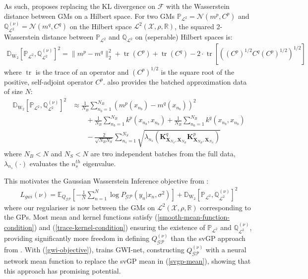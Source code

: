 \documentclass{article}
\newcommand{\WD}{\operatorname{\mathbb{D}_{W_2}}}
\newcommand{\tr}{\operatorname{tr}}
\newcommand{\GP}{\operatorname{\mathcal{GP}}}
\numberwithin{equation}{section}
\begin{document}
As such, \cite{wild2022generalized} proposes replacing the KL divergence on $\mathcal{F}$ with the Wasserstein distance between GMs on a Hilbert space. For two GMs $\mathbb{P}_{\mathcal{L}^2} = \mathcal{N}(m^p, C^p)$ and $\mathbb{Q}^{(\nu)}_{\mathcal{L}^2} = \mathcal{N}(m^q, C^q)$ on the Hilbert space $\mathcal{L}^2(\mathcal{X}, \rho, \mathbb{R})$, the squared 2-Wasserstein distance between $\mathbb{P}_{\mathcal{L}^2}$ and $\mathbb{Q}_{\mathcal{L}^2}$ on (seperable) Hilbert spaces is:
\begin{align}
    \label{wasserstein-distance}
    \WD \left[\mathbb{P}_{\mathcal{L}^2}, \mathbb{Q}^{(\nu)}_{\mathcal{L}^2}\right]^2 = \| m^p - m^q\|_2^2 + \tr(C^p) + \tr(C^q) - 2 \cdot \tr \left[ \left( \left(C^p\right)^{1/2} C^q \left(C^p\right)^{1/2}\right)^{1/2}\right]
\end{align}
where $\tr$ is the trace of an operator and $\left(C^p\right)^{1/2}$ is the square root of the positive, self-adjoint operator $C^p$. \cite{wild2022generalized} also provides the batched approximation data of size $N$:
\begin{align}
    \WD \left[\mathbb{P}_{\mathcal{L}^2}, \mathbb{Q}^{(\nu)}_{\mathcal{L}^2}\right]^2 &\approx \frac{1}{N_B}\sum_{n_b=1}^{N_B} \left(m^p(x_{n_b}) - m^q(x_{n_b})\right)^2 \nonumber \\
    & \qquad + \frac{1}{N_B} \sum_{n_b=1}^{N_B} k^p(x_{n_b}, x_{n_b}) + \frac{1}{N_B} \sum_{n_b=1}^{N_B} k^q(x_{n_b}, x_{n_b}) \nonumber \\
    & \qquad - \frac{2}{\sqrt{N_B N_S}} \sum_{n_s=1}^{N_S} \sqrt{\lambda_{n_s}\left(\mathbf{K}^q_{\mathbf{X}_{N_S}, \mathbf{X}_{N_B}}\mathbf{K}^p_{\mathbf{X}_{N_B}, \mathbf{X}_{N_S}}\right)}
    \label{wasserstein-distance-approximation}
\end{align}
where $N_B < N$ and $N_S < N$ are two independent batches from the full data, $\lambda_{n_s}(\cdot)$ evaluates the $n_s^{th}$ eigenvalue. 

This motivates the Gaussian Wasserstein Inference objective from \cite{wild2022generalized}:
\begin{align}
    \label{gwi-objective}
    L_{gwi}(\nu) = \mathbb{E}_{Q_{\GP}}\left[- \frac{1}{N}\sum_{n=1}^N \log P_{\GP}\left(y_n \vert x_n, \sigma^2\right) \right] + \WD \left[\mathbb{P}_{\mathcal{L}^2}, \mathbb{Q}^{(\nu)}_{\mathcal{L}^2}\right]^2
\end{align}
where our regulariser is now between the GMs on $\mathcal{L}^2(\mathcal{X}, \rho, \mathbb{R})$ corresponding to the GPs. Most mean and kernel functions satisfy (\ref{smooth-mean-function-condition}) and (\ref{trace-kernel-condition}) ensuring the existence of $\mathbb{P}_{\mathcal{L}^2}$ and $\mathbb{Q}^{(\nu)}_{\mathcal{L}^2}$, providing significantly more freedom in defining $Q^{(\nu)}_{\GP}$ than the svGP approach from \cite{titsias2009variational}. With (\ref{gwi-objective}), \cite{wild2022generalized} trains GWI-net, constructing $Q^{(\nu)}_{\GP}$ with a neural network mean function to replace the svGP mean in (\ref{svgp-mean}), showing that this approach has promising potential.
\end{document}
